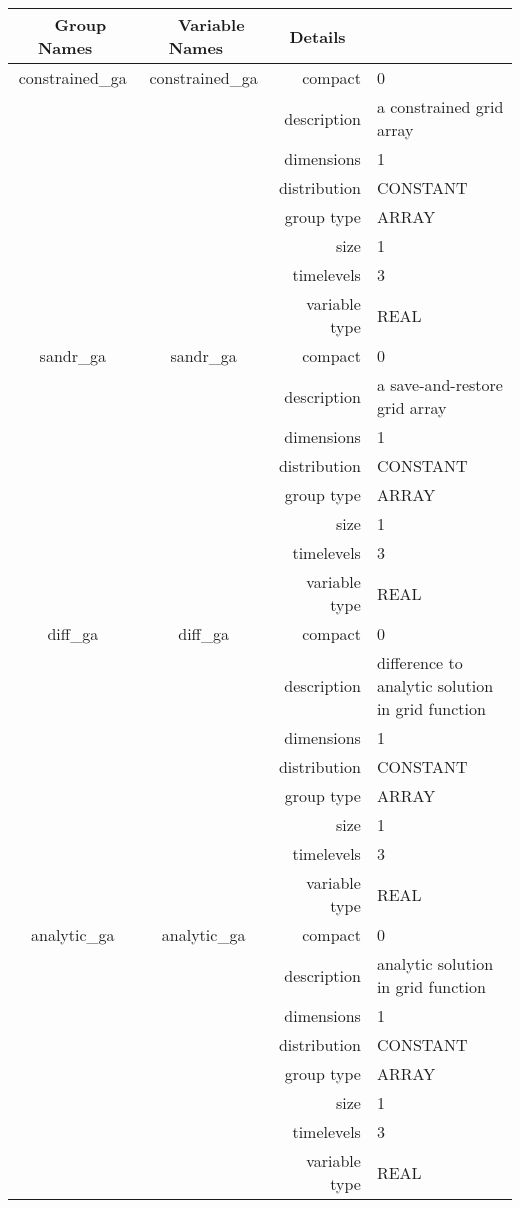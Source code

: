 \begin{tabular*}{150mm}{|c|c@{\extracolsep{\fill}}|rl|} \hline 
~ {\bf Group Names} ~ & ~ {\bf Variable Names} ~  &{\bf Details} ~ & ~ \\ 
\hline 
constrained\_ga & constrained\_ga & compact & 0 \\ 
 &  & description & a constrained grid array \\ 
 &  & dimensions & 1 \\ 
 &  & distribution & CONSTANT \\ 
 &  & group type & ARRAY \\ 
 &  & size & 1 \\ 
 &  & timelevels & 3 \\ 
 &  & variable type & REAL \\ 
\hline 
sandr\_ga & sandr\_ga & compact & 0 \\ 
 &  & description & a save-and-restore grid array \\ 
 &  & dimensions & 1 \\ 
 &  & distribution & CONSTANT \\ 
 &  & group type & ARRAY \\ 
 &  & size & 1 \\ 
 &  & timelevels & 3 \\ 
 &  & variable type & REAL \\ 
\hline 
diff\_ga & diff\_ga & compact & 0 \\ 
 &  & description & difference to analytic solution in grid function \\ 
 &  & dimensions & 1 \\ 
 &  & distribution & CONSTANT \\ 
 &  & group type & ARRAY \\ 
 &  & size & 1 \\ 
 &  & timelevels & 3 \\ 
 &  & variable type & REAL \\ 
\hline 
analytic\_ga & analytic\_ga & compact & 0 \\ 
 &  & description & analytic solution in grid function \\ 
 &  & dimensions & 1 \\ 
 &  & distribution & CONSTANT \\ 
 &  & group type & ARRAY \\ 
 &  & size & 1 \\ 
 &  & timelevels & 3 \\ 
 &  & variable type & REAL \\ 
\hline 
\end{tabular*} 




